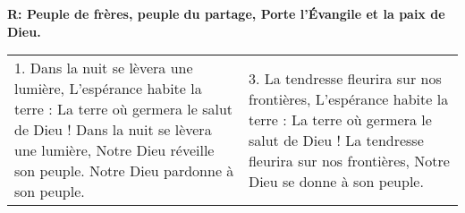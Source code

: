 
\textbf{R:
Peuple de frères, peuple du partage,
Porte l'Évangile et la paix de Dieu.}

\begin{tabular}{p{} p{}}
1.\newline
Dans la nuit se lèvera une lumière,\newline
L'espérance habite la terre :\newline
La terre où germera le salut de Dieu !\newline
Dans la nuit se lèvera une lumière,\newline
Notre Dieu réveille son peuple.\newline
Notre Dieu pardonne à son peuple.
&
3.\newline
La tendresse fleurira sur nos frontières,\newline
L'espérance habite la terre :\newline
La terre où germera le salut de Dieu !\newline
La tendresse fleurira sur nos frontières,\newline
Notre Dieu se donne à son peuple.
\end{tabular}

